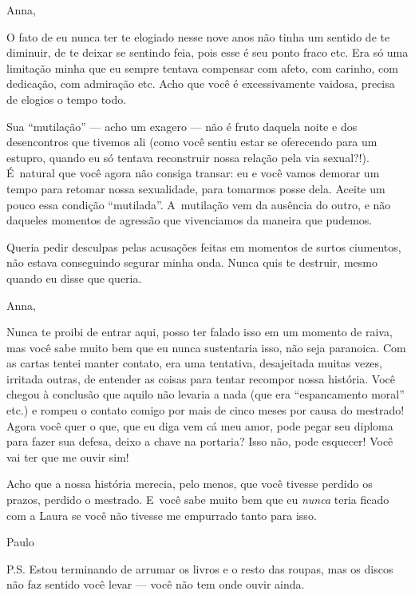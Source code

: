 Anna,

O fato de eu nunca ter te elogiado nesse nove anos não tinha um sentido
de te diminuir, de te deixar se sentindo feia, pois esse é seu ponto
fraco etc. Era só uma limitação minha que eu sempre tentava compensar
com afeto, com carinho, com dedicação, com admiração etc. Acho que você
é excessivamente vaidosa, precisa de elogios o tempo todo.

Sua ``mutilação'' --- acho um exagero --- não é fruto daquela noite e
dos desencontros que tivemos ali (como você sentiu estar se oferecendo
para um estupro, quando eu só tentava reconstruir nossa relação pela via
sexual?!). É~natural que você agora não consiga transar: eu e você vamos
demorar um tempo para retomar nossa sexualidade, para tomarmos posse
dela. Aceite um pouco essa condição ``mutilada''. A~mutilação vem da
ausência do outro, e não daqueles momentos de agressão que vivenciamos
da maneira que pudemos.

Queria pedir desculpas pelas acusações feitas em momentos de surtos
ciumentos, não estava conseguindo segurar minha onda. Nunca quis te
destruir, mesmo quando eu disse que queria.

\asterisc{}

Anna,

\medskip{} 

Nunca te proibi de entrar aqui, posso ter falado isso em um momento de
raiva, mas você sabe muito bem que eu nunca sustentaria isso, não seja
paranoica. Com as cartas tentei manter contato, era uma tentativa,
desajeitada muitas vezes, irritada outras, de entender as coisas para
tentar recompor nossa história. Você chegou à conclusão que aquilo não
levaria a nada (que era ``espancamento moral'' etc.) e rompeu o contato
comigo por mais de cinco meses por causa do mestrado! Agora você quer o
que, que eu diga vem cá meu amor, pode pegar seu diploma para fazer sua
defesa, deixo a chave na portaria? Isso não, pode esquecer! Você vai ter
que me ouvir sim!

Acho que a nossa história merecia, pelo menos, que você tivesse perdido
os prazos, perdido o mestrado. E~você sabe muito bem que eu \emph{nunca}
teria ficado com a Laura se você não tivesse me empurrado tanto para
isso.

\medskip{}  \begin{flushright}Paulo\end{flushright}

\bigskip{} 

P{}.S{}. Estou terminando de arrumar os livros e o resto das roupas,
mas os discos não faz sentido você levar --- você não tem onde ouvir
ainda.

